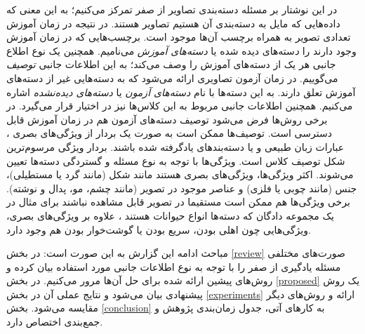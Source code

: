 در این نوشتار بر مسئله دسته‌بندی تصاویر از صفر تمرکز می‌کنیم؛ به این معنی که داده‌هایی که مایل به دسته‌بندی آن هستیم تصاویر هستند. در نتیجه در زمان آموزش تعدادی تصویر به همراه برچسب آن‌ها موجود است. برچسب‌هایی که در زمان آموزش وجود دارند را {\emph دسته‌های دیده شده} یا \emph{ دسته‌های آموزش} می‌نامیم. همچنین یک نوع اطلاع جانبی هر یک از دسته‌های آموزش را وصف می‌کند؛ به این اطلاعات جانبی \emph{ توصیف}  می‌گوییم. در زمان آزمون تصاویری ارائه می‌شود که به دسته‌هایی غیر از دسته‌های آموزش تعلق دارند. به این دسته‌ها با نام\emph{  دسته‌های آزمون}  یا \emph{ دسته‌های دیده‌نشده}  اشاره می‌کنیم. همچنین اطلاعات جانبی مربوط به این کلاس‌ها نیز در اختیار قرار می‌گیرد. در برخی روش‌ها فرض می‌شود توصیف دسته‌های آزمون هم در زمان آموزش قابل دسترسی است. توصیف‌ها ممکن است به صورت یک بردار از ویژگی‌های بصری \cite{farhadi09}،
 عبارات زبان طبیعی 
 \cite{ng13, mohamed13, noroz14}
 و یا دسته‌بندهای یادگرفته شده  \cite{Yu2013} باشند. بردار ویژگی مرسوم‌ترین شکل توصیف کلاس است. ویژگی‌ها با توجه به نوع مسئله و گستردگی دسته‌ها تعیین می‌شوند. اکثر ویژگی‌ها، ویژگی‌های بصری هستند مانند شکل (مانند گرد یا مستطیلی)، جنس (مانند چوبی یا فلزی) و عناصر موجود در تصویر (مانند چشم، مو، پدال و نوشته). برخی ویژگی‌ها هم ممکن است مستقیما در تصویر قابل مشاهده نباشند برای مثال در یک مجموعه دادگان که دسته‌ها انواع حیوانات هستند
 \cite{lampert09}،
 علاوه بر ویژگی‌های بصری، ویژگی‌هایی چون اهلی بودن، سریع‌ بودن یا گوشت‌خوار بودن هم وجود دارد. 
 
مباحث ادامه این گزارش به این صورت است: در بخش \ref{review} صورت‌های مختلفی مسئله یادگیری از صفر را با توجه به نوع اطلاعات جانبی مورد استفاده بیان کرده و روش‌های پیشین ارائه شده برای حل آن‌ها مرور می‌کنیم. در بخش \ref{proposed} یک روش پیشنهادی بیان می‌شود و نتایج عملی آن در بخش \ref{experiments} ارائه و روش‌های دیگر مقایسه می‌شود. بخش \ref{conclusion} به کارهای آتی، جدول زمان‌بندی پژوهش و جمع‌بندی اختصاص دارد. 


